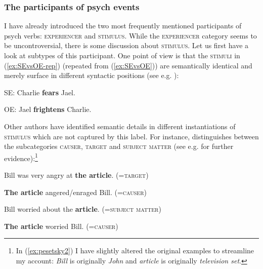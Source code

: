 \subsubsection{The participants of psych events}
\label{sec:psy-input-prev-part}

I have already introduced the two most frequently mentioned participants of psych verbs: \textsc{experiencer} and \textsc{stimulus}. While the \textsc{experiencer} category seems to be uncontroversial, there is some discussion about \textsc{stimulus}. Let us first have a look at subtypes of this participant. 
One point of view is that the \textsc{stimuli} in (\ref{ex:SEvsOE-rep}) (repeated from (\ref{ex:SEvsOE})) are semantically identical and merely surface in different syntactic positions (see e.g. \citealt{Belletti.1988, Grimshaw.1990, Levin.1993}):\largerpage

\begin{exe}
	\ex \label{ex:SEvsOE-rep}
	\begin{xlist}
		\item \label{ex:SEvsOE1-rep} SE: Charlie \textbf{fears} Jael.
		\item \label{ex:SEvsOE2-rep} OE: Jael \textbf{frightens} Charlie.
	\end{xlist}
\end{exe}

\noindent Other authors have identified semantic details in different instantiations of \textsc{stimulus} which are not captured by this label. 
For instance, \citet[56--57]{Pesetsky.1995} distinguishes between the subcategories \textsc{causer, target} and \textsc{subject matter} (see e.g. \citealt{Hartl.2001} for further evidence):\footnote{In (\ref{ex:pesetsky2}) I have slightly altered the original examples to streamline my account: \textit{Bill} is originally \textit{John} and \textit{article} is originally \textit{television set}.}  

\begin{exe}
	\ex \label{ex:pesetsky1}
	\begin{xlist}
		\item \label{ex:target} Bill was very angry at \textbf{the article}. (=\textsc{target})
		\item \label{ex:causer1} \textbf{The article} angered/enraged Bill. (=\textsc{causer})
	\end{xlist}
	\ex \label{ex:pesetsky2}
	\begin{xlist}
		\item \label{ex:subjectmatter} Bill worried about the \textbf{article}. (=\textsc{subject matter})
		\item \label{ex:causer2} \textbf{The article} worried Bill. (=\textsc{causer})
	\end{xlist}
\end{exe}

